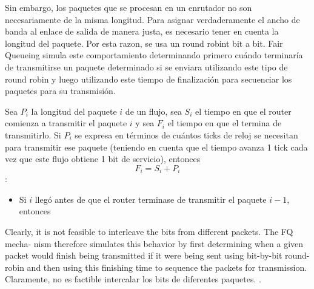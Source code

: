 Sin embargo, los paquetes que se procesan en un enrutador no son necesariamente de la misma longitud. Para asignar verdaderamente el ancho de banda al enlace de salida de manera justa, es necesario tener en cuenta la longitud del paquete. Por esta razon, se usa un round robint bit a bit. Fair Queueing simula este comportamiento determinando primero cuándo terminaría de transmitirse un paquete determinado si se enviara utilizando este tipo de round robin y luego utilizando este tiempo de finalización para secuenciar los paquetes para su transmisión.


Sea \(P_i\) la longitud del paquete \(i\) de un flujo, sea \(S_i\) el tiempo en que el router comienza a transmitir el paquete \(i\) y sea \(F_i\) el tiempo en que el  termina de transmitirlo. Si \(P_i\) se expresa en términos de cuántos ticks de reloj se necesitan para transmitir ese paquete (teniendo en cuenta que el tiempo avanza 1 tick cada vez que este flujo obtiene 1 bit de servicio), entonces  \[F_i = S_i + P_i\]:
\begin{itemize}
  \item Si \(i\) llegó antes de que el router terminase de transmitir el paquete \(i-1\), entonces 
\end{itemize}




\newpage  
Clearly, it is 
not feasible to interleave the bits from different packets. The FQ mecha-
nism therefore simulates this behavior by first determining when a given 
packet would finish being transmitted if it were being sent using bit-by-bit 
round-robin and then using this finishing time to sequence the packets 
for transmission.
Claramente, no es factible intercalar los bits de diferentes paquetes. .





